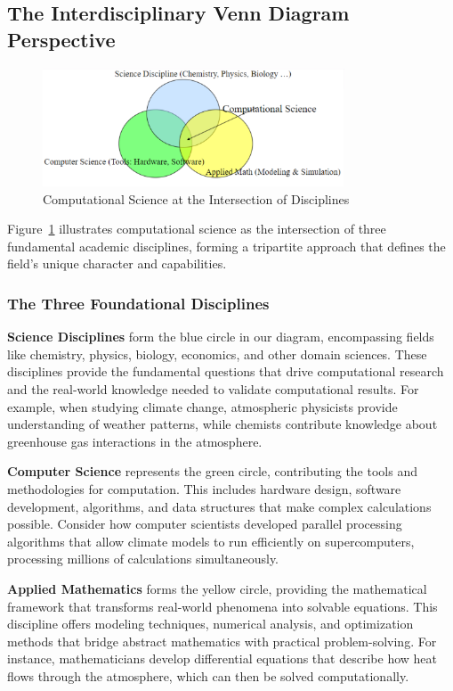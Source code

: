 \subsection{The Interdisciplinary Venn Diagram Perspective}

\begin{figure}[h]
 \centering
 \includegraphics[width=0.8\textwidth]{images/computational_science_venn.png}
 \caption{Computational Science at the Intersection of Disciplines}
 \label{fig:computational_science_venn}
\end{figure}

Figure~\ref{fig:computational_science_venn} illustrates computational science as the intersection of three fundamental academic disciplines, forming a tripartite approach that defines the field's unique character and capabilities.

\subsubsection{The Three Foundational Disciplines}

\textbf{Science Disciplines} form the blue circle in our diagram, encompassing fields like chemistry, physics, biology, economics, and other domain sciences. These disciplines provide the fundamental questions that drive computational research and the real-world knowledge needed to validate computational results. For example, when studying climate change, atmospheric physicists provide understanding of weather patterns, while chemists contribute knowledge about greenhouse gas interactions in the atmosphere.

\textbf{Computer Science} represents the green circle, contributing the tools and methodologies for computation. This includes hardware design, software development, algorithms, and data structures that make complex calculations possible. Consider how computer scientists developed parallel processing algorithms that allow climate models to run efficiently on supercomputers, processing millions of calculations simultaneously.

\textbf{Applied Mathematics} forms the yellow circle, providing the mathematical framework that transforms real-world phenomena into solvable equations. This discipline offers modeling techniques, numerical analysis, and optimization methods that bridge abstract mathematics with practical problem-solving. For instance, mathematicians develop differential equations that describe how heat flows through the atmosphere, which can then be solved computationally.

